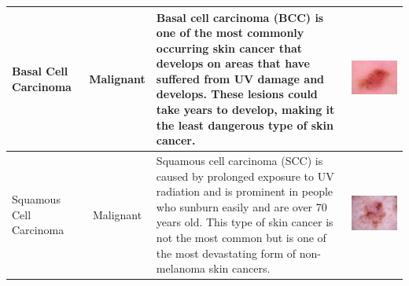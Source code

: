 {\begin{tabular}{|m{3cm}|c|m{15cm}|m{3cm}|}
	\\
	\hline
	Basal Cell Carcinoma & Malignant & 
	Basal cell carcinoma (BCC) is one of the most commonly occurring skin cancer that develops on areas that have suffered from UV damage and develops. These lesions could take years to develop, making it the least dangerous type of skin cancer.  & 
	\includegraphics[scale=0.15]{images/intro/figure-3-bcc.jpg} 
	\\
	\hline
	Squamous Cell Carcinoma & Malignant & 
	Squamous cell carcinoma (SCC) is caused by prolonged exposure to UV radiation and is prominent in people who sunburn easily and are over 70 years old. This type of skin cancer is not the most common but is one of the most devastating form of non-melanoma skin cancers. & 
	\includegraphics[scale=0.15]{images/intro/figure-3-scc.jpg} 

\end{tabular}}
